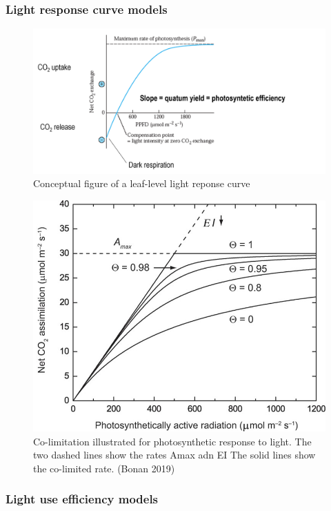 \documentclass[12pt,oneside]{book}
\begin{document}
\subsubsection{Light response curve
models}\label{light-response-curve-models}

\begin{figure}

{\centering \includegraphics[width=0.8\linewidth]{figures/chap2/LRC} 

}

\caption{Conceptual figure of a leaf-level light reponse curve}\label{fig:f24}
\end{figure}

\begin{figure}

{\centering \includegraphics[width=0.8\linewidth]{figures/chap2/hyperbola} 

}

\caption{Co-limitation illustrated for photosynthetic response to light. The two dashed lines show the rates Amax adn EI The solid lines show the co-limited rate. (Bonan 2019)}\label{fig:f25}
\end{figure}

\subsubsection{Light use efficiency
models}\label{light-use-efficiency-models}
\end{document}
